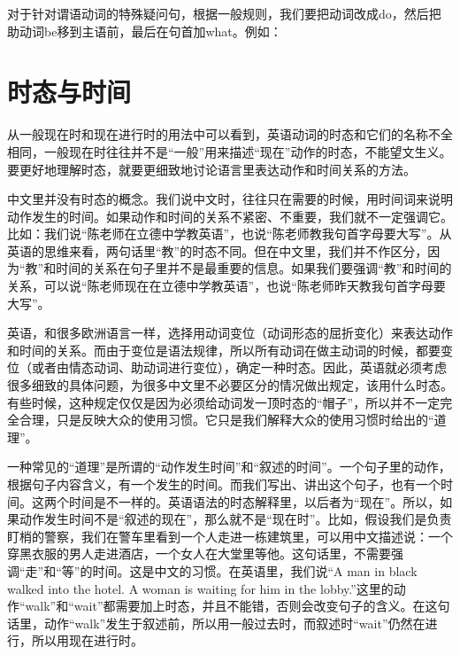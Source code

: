 \documentclass[10.5pt, a4paper]{ctexbook} %
\begin{document}
\begin{liju}
\end{liju}

对于针对谓语动词的特殊疑问句，根据一般规则，我们要把动词改成do，然后把助动词be移到主语前，最后在句首加what。例如：

\begin{liju}
\end{liju}

\section{时态与时间}

从一般现在时和现在进行时的用法中可以看到，英语动词的时态和它们的名称不全相同，一般现在时往往并不是“一般”用来描述“现在”动作的时态，不能望文生义。要更好地理解时态，就要更细致地讨论语言里表达动作和时间关系的方法。

中文里并没有时态的概念。我们说中文时，往往只在需要的时候，用时间词来说明动作发生的时间。如果动作和时间的关系不紧密、不重要，我们就不一定强调它。比如：我们说“陈老师在立德中学教英语”，也说“陈老师教我句首字母要大写”。从英语的思维来看，两句话里“教”的时态不同。但在中文里，我们并不作区分，因为“教”和时间的关系在句子里并不是最重要的信息。如果我们要强调“教”和时间的关系，可以说“陈老师现在在立德中学教英语”，也说“陈老师昨天教我句首字母要大写”。

英语，和很多欧洲语言一样，选择用动词变位（动词形态的屈折变化）来表达动作和时间的关系。而由于变位是语法规律，所以所有动词在做主动词的时候，都要变位（或者由情态动词、助动词进行变位），确定一种时态。因此，英语就必须考虑很多细致的具体问题，为很多中文里不必要区分的情况做出规定，该用什么时态。有些时候，这种规定仅仅是因为必须给动词发一顶时态的“帽子”，所以并不一定完全合理，只是反映大众的使用习惯。它只是我们解释大众的使用习惯时给出的“道理”。

一种常见的“道理”是所谓的“动作发生时间”和“叙述的时间”。一个句子里的动作，根据句子内容含义，有一个发生的时间。而我们写出、讲出这个句子，也有一个时间。这两个时间是不一样的。英语语法的时态解释里，以后者为“现在”。所以，如果动作发生时间不是“叙述的现在”，那么就不是“现在时”。比如，假设我们是负责盯梢的警察，我们在警车里看到一个人走进一栋建筑里，可以用中文描述说：一个穿黑衣服的男人走进酒店，一个女人在大堂里等他。这句话里，不需要强调“走”和“等”的时间。这是中文的习惯。在英语里，我们说“A man in black walked into the hotel. A woman is waiting for him in the lobby.”这里的动作“walk”和“wait”都需要加上时态，并且不能错，否则会改变句子的含义。在这句话里，动作“walk”发生于叙述前，所以用一般过去时，而叙述时“wait”仍然在进行，所以用现在进行时。
\end{document}
